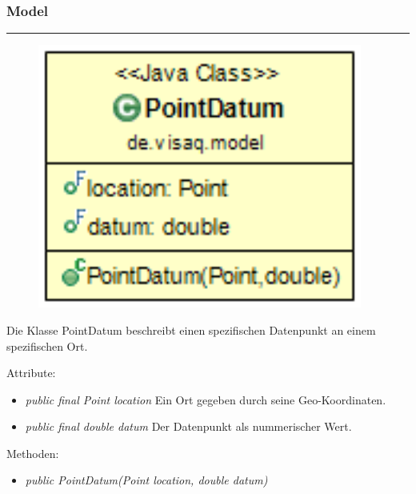 \subsubsection{Model}
\newpage



\rule{\textwidth}{0.4pt}
\begin{minipage}{0.4\textwidth}
    \begin{figure}[H]
        {\centering\includegraphics[width=0.95\textwidth]{media/backend/modell/classes/PointDatum.png}}
    \end{figure}
    \end{minipage} \hfill
\begin{minipage}{0.6\textwidth}
    Die Klasse PointDatum beschreibt einen spezifischen Datenpunkt an einem spezifischen Ort.
\end{minipage}

Attribute:
\begin{itemize}
    \item \emph{public final Point location} Ein Ort gegeben durch seine Geo-Koordinaten.
    \item \emph{public final double datum} Der Datenpunkt als nummerischer Wert.
\end{itemize}
Methoden:
\begin{itemize}
    \item \emph{public PointDatum(Point location, double datum)}
\end{itemize}

